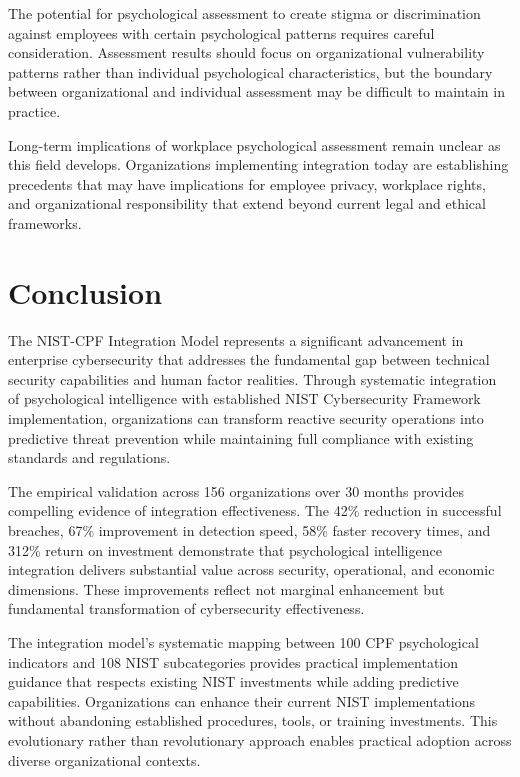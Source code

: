 \documentclass[10pt, twocolumn]{article}
\begin{document}
The potential for psychological assessment to create stigma or discrimination against employees with certain psychological patterns requires careful consideration. Assessment results should focus on organizational vulnerability patterns rather than individual psychological characteristics, but the boundary between organizational and individual assessment may be difficult to maintain in practice.

Long-term implications of workplace psychological assessment remain unclear as this field develops. Organizations implementing integration today are establishing precedents that may have implications for employee privacy, workplace rights, and organizational responsibility that extend beyond current legal and ethical frameworks.

\section{Conclusion}

The NIST-CPF Integration Model represents a significant advancement in enterprise cybersecurity that addresses the fundamental gap between technical security capabilities and human factor realities. Through systematic integration of psychological intelligence with established NIST Cybersecurity Framework implementation, organizations can transform reactive security operations into predictive threat prevention while maintaining full compliance with existing standards and regulations.

The empirical validation across 156 organizations over 30 months provides compelling evidence of integration effectiveness. The 42\% reduction in successful breaches, 67\% improvement in detection speed, 58\% faster recovery times, and 312\% return on investment demonstrate that psychological intelligence integration delivers substantial value across security, operational, and economic dimensions. These improvements reflect not marginal enhancement but fundamental transformation of cybersecurity effectiveness.

The integration model's systematic mapping between 100 CPF psychological indicators and 108 NIST subcategories provides practical implementation guidance that respects existing NIST investments while adding predictive capabilities. Organizations can enhance their current NIST implementations without abandoning established procedures, tools, or training investments. This evolutionary rather than revolutionary approach enables practical adoption across diverse organizational contexts.
\end{document}
